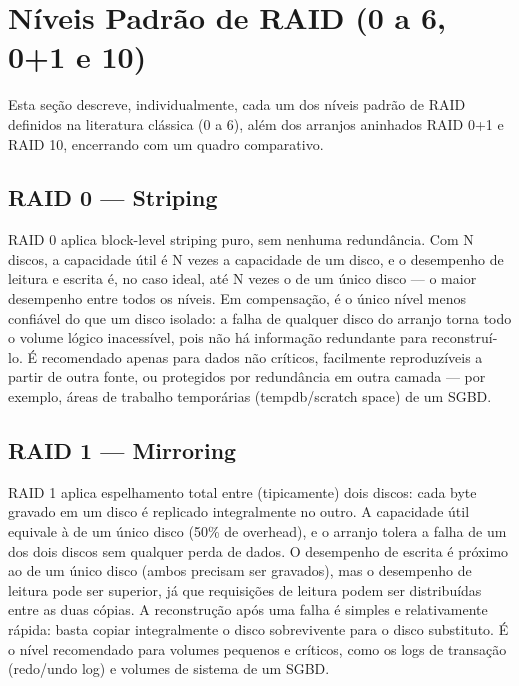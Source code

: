 \documentclass[11pt,a4paper]{article}
\begin{document}
\section{Níveis Padrão de RAID (0 a 6, 0+1 e 10)}
Esta seção descreve, individualmente, cada um dos níveis padrão de RAID definidos na literatura clássica (0 a 6), além dos arranjos aninhados RAID 0+1 e RAID 10, encerrando com um quadro comparativo.

\subsection{RAID 0 --- Striping}
RAID 0 aplica block-level striping puro, sem nenhuma redundância. Com N discos, a capacidade útil é N vezes a capacidade de um disco, e o desempenho de leitura e escrita é, no caso ideal, até N vezes o de um único disco --- o maior desempenho entre todos os níveis. Em compensação, é o único nível menos confiável do que um disco isolado: a falha de qualquer disco do arranjo torna todo o volume lógico inacessível, pois não há informação redundante para reconstruí-lo. É recomendado apenas para dados não críticos, facilmente reproduzíveis a partir de outra fonte, ou protegidos por redundância em outra camada --- por exemplo, áreas de trabalho temporárias (tempdb/scratch space) de um SGBD.

\subsection{RAID 1 --- Mirroring}
RAID 1 aplica espelhamento total entre (tipicamente) dois discos: cada byte gravado em um disco é replicado integralmente no outro. A capacidade útil equivale à de um único disco (50\% de overhead), e o arranjo tolera a falha de um dos dois discos sem qualquer perda de dados. O desempenho de escrita é próximo ao de um único disco (ambos precisam ser gravados), mas o desempenho de leitura pode ser superior, já que requisições de leitura podem ser distribuídas entre as duas cópias. A reconstrução após uma falha é simples e relativamente rápida: basta copiar integralmente o disco sobrevivente para o disco substituto. É o nível recomendado para volumes pequenos e críticos, como os logs de transação (redo/undo log) e volumes de sistema de um SGBD.
\end{document}
